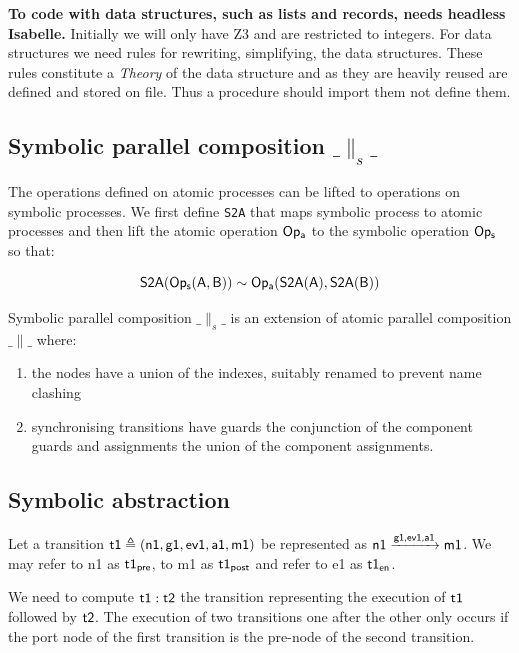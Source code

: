 \documentclass[]{article}
\begin{document}
{\bf To code with data structures, such as lists and records,  needs headless Isabelle.}  Initially we will only have Z3 and are restricted to integers.  For data structures  we need rules for rewriting, simplifying, the data structures. These rules constitute a \emph{Theory} of the data structure and as they are heavily reused are defined and stored on file. Thus a procedure should import them  not define them.




\subsection{Symbolic parallel composition $\_\parallel_s\_$}
The operations defined on atomic processes can be lifted to operations on symbolic processes. We first define \verb|S2A| that maps symbolic process to atomic processes and then lift  the atomic  operation ${\sf Op_a}$ to the symbolic operation ${\sf Op_s}$ so that:

\[{\sf S2A(Op_s(A,B))\sim  Op_a(S2A(A),S2A(B)) }\]

Symbolic parallel composition $\_\parallel_s\_$ is an extension of  atomic parallel composition $\_\parallel\_$ where:
\begin{enumerate}
\item the nodes have a union of the indexes, suitably renamed to prevent name clashing
\item synchronising transitions have guards the conjunction of the component guards and assignments the union of the component assignments.
\end{enumerate}


\subsection{Symbolic abstraction}


Let a transition  ${\sf t1 \triangleq (n1,g1,ev1,a1,m1)}$  be represented as   ${\sf n1\xrightarrow{\text{\sf g1,ev1,a1}} m1}$. We may refer to {\sf n1}  as ${\sf t1_{pre}}$,  to {\sf m1}  as ${\sf t1_{post}}$ and refer to {\sf e1}  as ${\sf t1_{en}}$.

We need to  compute $\sf t1: t2$  the transition representing the execution of $\sf t1$ followed by $\sf t2$.  The execution of two transitions one after the other only occurs if the port node of the first transition is the pre-node of the second transition.

\end{document}
